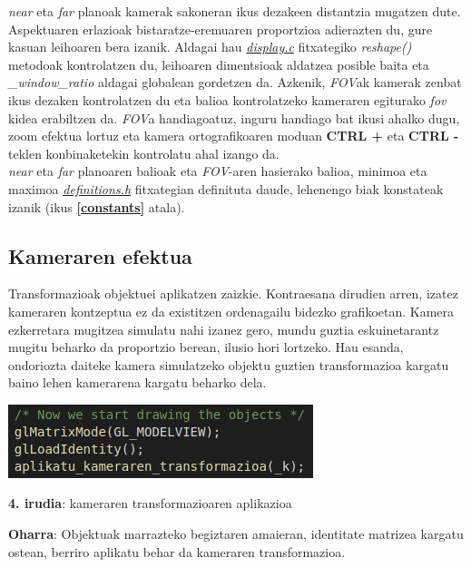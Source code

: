 \documentclass[12pt]{article}
\newcommand{\fitxategi}[1] {\underline{\textit{#1}}}
\newcommand{\metodo}[1] {\textit{#1}}
\newcommand{\aldagai}[1] {\textit{#1}}
\newcommand{\tekla}[1] {\textbf{#1}}
\newcommand{\erref}[1] {\textbf{\ref{#1}}}
\begin{document}
\textit{near} eta \textit{far} planoak kamerak sakoneran ikus dezakeen distantzia mugatzen dute. Aspektuaren erlazioak bistaratze-eremuaren proportzioa adierazten du, gure kasuan leihoaren bera izanik. Aldagai hau \fitxategi{display.c} fitxategiko \metodo{reshape()} metodoak kontrolatzen du, leihoaren dimentsioak aldatzea posible baita eta \aldagai{\_window\_ratio} aldagai globalean gordetzen da. Azkenik, \textit{FOV}ak kamerak zenbat ikus dezaken kontrolatzen du eta balioa kontrolatzeko kameraren egiturako \aldagai{fov} kidea erabiltzen da. \textit{FOV}a handiagoatuz, inguru handiago bat ikusi ahalko dugu, zoom efektua lortuz eta kamera ortografikoaren moduan \tekla{CTRL +} eta \tekla{CTRL -} teklen konbinaketekin kontrolatu ahal izango da.\\

\textit{near} eta \textit{far} planoaren balioak eta \textit{FOV}-aren hasierako balioa, minimoa eta maximoa \fitxategi{definitions.h} fitxategian definituta daude, lehenengo biak konstateak izanik (ikus \erref{constants} atala).


\subsection{Kameraren efektua}\label{kam_sim}

Transformazioak objektuei aplikatzen zaizkie. Kontraesana dirudien arren, izatez kameraren kontzeptua ez da existitzen ordenagailu bidezko grafikoetan. Kamera ezkerretara mugitzea simulatu nahi izanez gero, mundu guztia eskuinetarantz mugitu beharko da proportzio berean, ilusio hori lortzeko. Hau esanda, ondoriozta daiteke kamera simulatzeko objektu guztien transformazioa kargatu baino lehen kamerarena kargatu beharko dela.

\begin{center}
\includegraphics[scale=0.7]{kamera_transform.png}

\textbf{4. irudia}: kameraren transformazioaren aplikazioa
\end{center}

\textbf{Oharra}: Objektuak marrazteko begiztaren amaieran, identitate matrizea kargatu ostean, berriro aplikatu behar da kameraren transformazioa.\\
\end{document}
